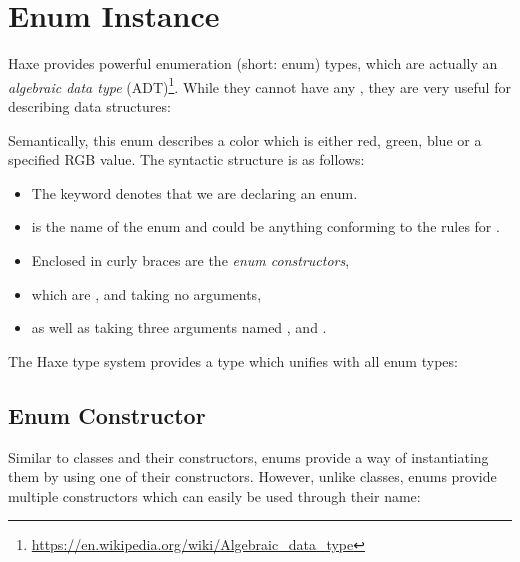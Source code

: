 

\section{Enum Instance}
\label{types-enum-instance}

Haxe provides powerful enumeration (short: enum) types, which are actually an \emph{algebraic data type} (ADT)\footnote{\url{https://en.wikipedia.org/wiki/Algebraic_data_type}}. While they cannot have any , they are very useful for describing data structures:

Semantically, this enum describes a color which is either red, green, blue or a specified RGB value. The syntactic structure is as follows:
\begin{itemize}
	\item The keyword  denotes that we are declaring an enum.
	\item {} is the name of the enum and could be anything conforming to the rules for .
	\item Enclosed in curly braces \expr{$\left\{\right\}$} are the \emph{enum constructors},
	\item which are ,  and  taking no arguments,
	\item as well as  taking three  arguments named ,  and .
\end{itemize}
The Haxe type system provides a type which unifies with all enum types:


\subsection{Enum Constructor}
\label{types-enum-constructor}

Similar to classes and their constructors, enums provide a way of instantiating them by using one of their constructors. However, unlike classes, enums provide multiple constructors which can easily be used through their name:

